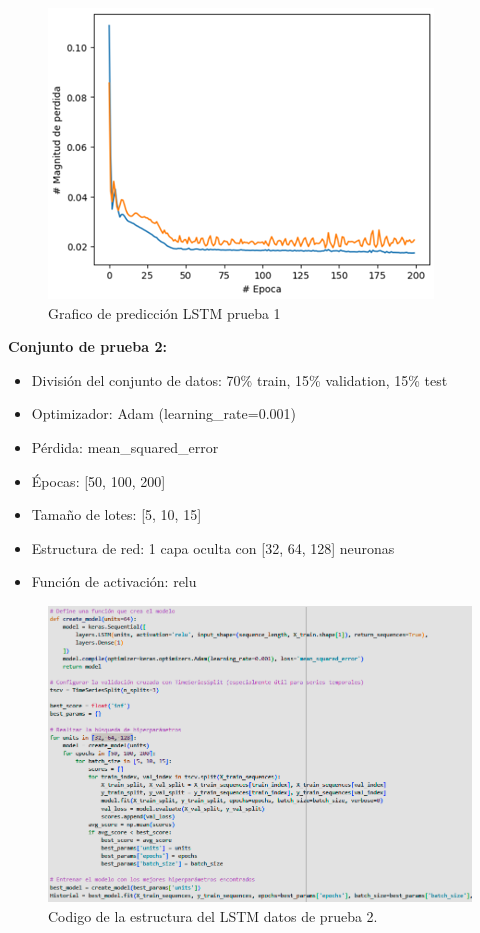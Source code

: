\begin{figure}[H]
  \begin{center}
    \includegraphics[scale=0.80]{./imagenlstm1.png}
    \caption{Grafico de predicción LSTM prueba 1}
    \label{fig:res2}
  \end{center}
\end{figure}

\vspace{1\baselineskip}
\textbf{Conjunto de prueba 2:}
\begin{itemize}
  \item División del conjunto de datos: 70\% train, 15\% validation, 15\% test
  \item Optimizador: Adam (learning\_rate=0.001)
  \item Pérdida: mean\_squared\_error
  \item Épocas: [50, 100, 200]
  \item Tamaño de lotes: [5, 10, 15]
  \item Estructura de red: 1 capa oculta con [32, 64, 128] neuronas
  \item Función de activación: relu
\end{itemize}

\begin{figure}[H]
  \begin{center}
    \includegraphics[scale=0.50]{./arqui2i.png}
    \caption{Codigo de la estructura del LSTM datos de prueba 2.}
    \label{fig:arqui2i}
  \end{center}
\end{figure}

